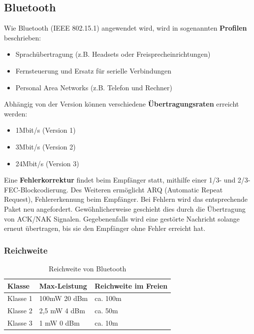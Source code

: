 \documentclass{article} %
\begin{document}
\subsection{Bluetooth}
Wie Bluetooth (IEEE 802.15.1) angewendet wird, wird in sogenannten \textbf{Profilen} beschrieben:
	\begin{itemize}
	\item Sprachübertragung (z.B. Headsets oder Freisprecheinrichtungen) 
	\item Fernsteuerung und Ersatz für serielle Verbindungen 
	\item Personal Area Networks (z.B. Telefon und Rechner) 
	\end{itemize}
	
\noindent Abhängig von der Version können verschiedene \textbf{Übertragungsraten} erreicht werden:
	\begin{itemize}
	\item 1Mbit/s (Version 1)
	\item 3Mbit/s (Version 2)
	\item 24Mbit/s (Version 3)
	\end{itemize}

\noindent Eine \textbf{Fehlerkorrektur} findet beim Empfänger statt, mithilfe einer 1/3- und 2/3-FEC-Blockcodierung. Des Weiteren ermöglicht ARQ (Automatic Repeat Request), Fehlererkennung beim Empfänger. Bei Fehlern wird das entsprechende Paket neu angefordert. Gewöhnlicherweise geschieht dies durch die Übertragung von ACK/NAK Signalen. Gegebenenfalls wird eine gestörte Nachricht solange erneut übertragen, bis sie den Empfänger ohne Fehler erreicht hat.

\subsubsection{Reichweite}
	\begin{table}[h]
	\centering
	\label{tab:bluetooth_range}
		\begin{tabular}{|l|l|l|}
		\hline
		\textbf{Klasse} & \textbf{Max-Leistung} & \textbf{Reichweite im Freien} \\ 
		\hline
		Klasse 1 & 100mW 20 dBm & ca. 100m\\ \hline
		Klasse 2 & 2,5 mW 4 dBm & ca. 50m   \\ 		\hline
		Klasse 3 & 1 mW 0 dBm & ca. 10m   \\ 		\hline
		\end{tabular}
	\caption{Reichweite von Bluetooth}
	\end{table}
	
\end{document}
